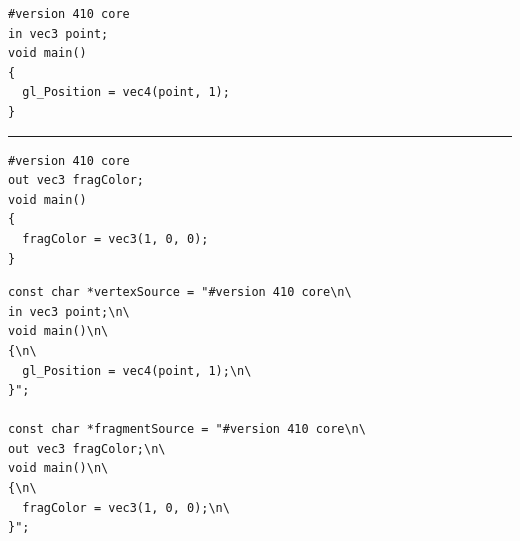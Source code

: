 \documentclass[calcdimensions,landscape,letterpaper]{powersem}
\newcommand{\thecurrentheading}{}
\newcommand{\heading}[1]{\renewcommand{\thecurrentheading}{#1}}
\begin{document}
\begin{slide}
  \heading{Minimal Pipeline: Overview}
  \begin{center}
  \end{center}
\end{slide}

\begin{slide}
    \heading{Minimal Pipeline: Shader Code (GLSL)}
    \begin{center}
        \begin{minipage}[c]{.5\textwidth}
            \begin{verbatim}
#version 410 core
in vec3 point;
void main()
{
  gl_Position = vec4(point, 1);
}
            \end{verbatim}
            \vspace{-10pt}
            \rule{4cm}{0.4pt}
            \begin{verbatim}
#version 410 core
out vec3 fragColor;
void main()
{
  fragColor = vec3(1, 0, 0);
}
            \end{verbatim}
        \end{minipage}
    \end{center}
\end{slide}

\begin{slide}
    \heading{Minimal Pipeline: C Strings}
    \begin{center}
        \begin{minipage}[c]{.7\textwidth}
            \begin{verbatim}
const char *vertexSource = "#version 410 core\n\
in vec3 point;\n\
void main()\n\
{\n\
  gl_Position = vec4(point, 1);\n\
}";

const char *fragmentSource = "#version 410 core\n\
out vec3 fragColor;\n\
void main()\n\
{\n\
  fragColor = vec3(1, 0, 0);\n\
}";
            \end{verbatim}
        \end{minipage}
    \end{center}
\end{slide}
\end{document}
